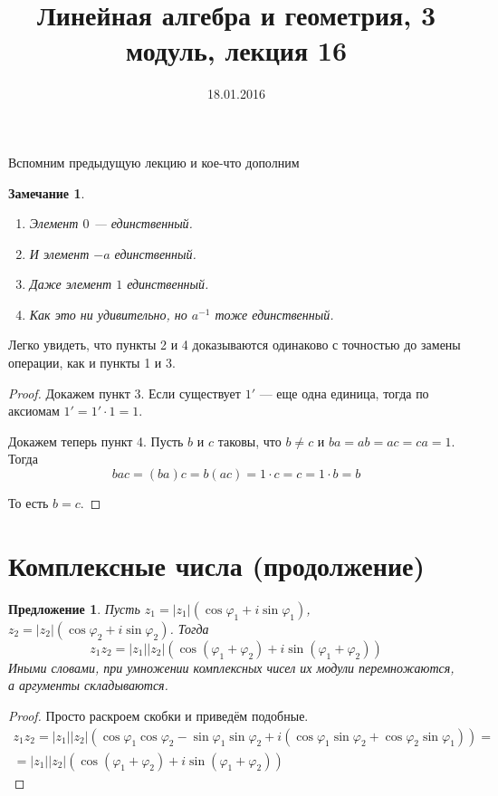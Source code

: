 \documentclass[a4paper,12pt]{article}
\author{}
\title{Линейная алгебра и геометрия, 3 модуль, лекция 16}
\date{18.01.2016}
\newtheorem*{Suggestion}{Предложение}
\newtheorem*{Comment}{Замечание}
\begin{document}
\maketitle
Вспомним предыдущую лекцию и кое-что дополним
\begin{Comment}
\ 
\begin{enumerate}
    \item Элемент $0$ --- единственный.
    \item И элемент $-a$ единственный.
    \item Даже элемент $1$ единственный.
    \item Как это ни удивительно, но $a^{-1}$ тоже единственный.
\end{enumerate}
\end{Comment}
Легко увидеть, что пункты 2 и 4 доказываются одинаково с точностью до замены операции, как и пункты 1 и 3.

\begin{proof}
Докажем пункт 3. Если существует $1'$ --- еще одна единица, тогда по аксиомам $1'=1'\cdot1=1$.

Докажем теперь пункт 4. Пусть $b$ и $c$ таковы, что $b \neq c$ и $ba = ab = ac = ca = 1$. Тогда 
\[
bac = \left(ba\right)c = b\left(ac\right) = 1\cdot c = c = 1 \cdot b = b
\]

То есть $b = c$.
\end{proof}

\section*{Комплексные числа (продолжение)}

\begin{Suggestion}
Пусть $z_1 = |z_1|\left(\cos{\varphi_1}+i\sin{\varphi_1}\right)$, $z_2 = |z_2|\left(\cos{\varphi_2} + i\sin{\varphi_2}\right)$. Тогда 
\[
z_1z_2 = |z_1||z_2|\left(\cos\left(\varphi_1 + \varphi_2\right) + i\sin\left(\varphi_1 + \varphi_2\right)\right)
\]
Иными словами, при умножении комплексных чисел их модули перемножаются, а аргументы складываются.
\end{Suggestion}

\begin{proof}
Просто раскроем скобки и приведём подобные.
\begin{gather*}
z_1z_2 = |z_1||z_2|\left(\cos\varphi_1\cos\varphi_2-\sin\varphi_1\sin\varphi_2 + i\left(\cos\varphi_1\sin\varphi_2+\cos\varphi_2\sin\varphi_1\right)\right) = \\ =|z_1||z_2|\left(\cos\left(\varphi_1 + \varphi_2\right) + i\sin\left(\varphi_1 + \varphi_2\right)\right)
\end{gather*}
\end{proof}
\end{document}

